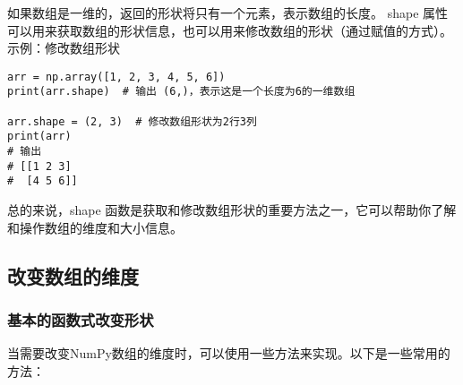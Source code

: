 \documentclass{article}
\begin{document}
如果数组是一维的，返回的形状将只有一个元素，表示数组的长度。
shape 属性可以用来获取数组的形状信息，也可以用来修改数组的形状（通过赋值的方式）。
示例：修改数组形状
\begin{lstlisting}[caption={示例Python代码}]
arr = np.array([1, 2, 3, 4, 5, 6])
print(arr.shape)  # 输出 (6,)，表示这是一个长度为6的一维数组

arr.shape = (2, 3)  # 修改数组形状为2行3列
print(arr)
# 输出
# [[1 2 3]
#  [4 5 6]]
\end{lstlisting}
总的来说，shape 函数是获取和修改数组形状的重要方法之一，它可以帮助你了解和操作数组的维度和大小信息。
\subsection{改变数组的维度}
\subsubsection{基本的函数式改变形状}
当需要改变NumPy数组的维度时，可以使用一些方法来实现。以下是一些常用的方法：
\end{document}
